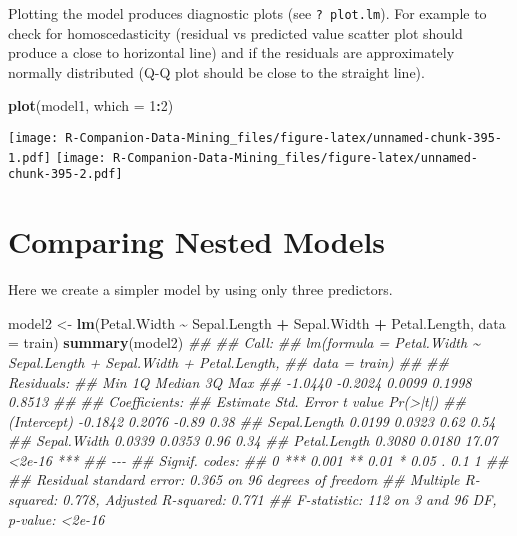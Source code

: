 \documentclass[
  notitlepage]{book}
\newenvironment{Shaded}{\begin{snugshade}}{\end{snugshade}}
\newcommand{\CommentTok}[1]{\textcolor[rgb]{0.56,0.35,0.01}{\textit{#1}}}
\newcommand{\DataTypeTok}[1]{\textcolor[rgb]{0.13,0.29,0.53}{#1}}
\newcommand{\DecValTok}[1]{\textcolor[rgb]{0.00,0.00,0.81}{#1}}
\newcommand{\KeywordTok}[1]{\textcolor[rgb]{0.13,0.29,0.53}{\textbf{#1}}}
\newcommand{\NormalTok}[1]{#1}
\newcommand{\OperatorTok}[1]{\textcolor[rgb]{0.81,0.36,0.00}{\textbf{#1}}}
\newcommand{\StringTok}[1]{\textcolor[rgb]{0.31,0.60,0.02}{#1}}
\begin{document}
Plotting the model produces diagnostic plots (see \texttt{?\ plot.lm}). For example
to check for homoscedasticity (residual vs predicted value scatter plot should produce a close to horizontal line)
and if the residuals are approximately normally distributed (Q-Q plot should be close to the straight line).

\begin{Shaded}
\begin{Highlighting}[]
\KeywordTok{plot}\NormalTok{(model1, }\DataTypeTok{which =} \DecValTok{1}\OperatorTok{:}\DecValTok{2}\NormalTok{)}
\end{Highlighting}
\end{Shaded}

\texttt{[image: R-Companion-Data-Mining\_files/figure-latex/unnamed-chunk-395-1.pdf]} \texttt{[image: R-Companion-Data-Mining\_files/figure-latex/unnamed-chunk-395-2.pdf]}

\hypertarget{comparing-nested-models}{%
\section{Comparing Nested Models}\label{comparing-nested-models}}

Here we create a simpler model by using only three predictors.

\begin{Shaded}
\begin{Highlighting}[]
\NormalTok{model2 \textless{}{-}}\StringTok{ }\KeywordTok{lm}\NormalTok{(Petal.Width }\OperatorTok{\textasciitilde{}}\StringTok{ }\NormalTok{Sepal.Length }\OperatorTok{+}\StringTok{ }
\StringTok{               }\NormalTok{Sepal.Width }\OperatorTok{+}\StringTok{ }\NormalTok{Petal.Length,}
             \DataTypeTok{data =}\NormalTok{ train)}
\KeywordTok{summary}\NormalTok{(model2)}
\CommentTok{\#\# }
\CommentTok{\#\# Call:}
\CommentTok{\#\# lm(formula = Petal.Width \textasciitilde{} Sepal.Length + Sepal.Width + Petal.Length, }
\CommentTok{\#\#     data = train)}
\CommentTok{\#\# }
\CommentTok{\#\# Residuals:}
\CommentTok{\#\#     Min      1Q  Median      3Q     Max }
\CommentTok{\#\# {-}1.0440 {-}0.2024  0.0099  0.1998  0.8513 }
\CommentTok{\#\# }
\CommentTok{\#\# Coefficients:}
\CommentTok{\#\#              Estimate Std. Error t value Pr(\textgreater{}|t|)    }
\CommentTok{\#\# (Intercept)   {-}0.1842     0.2076   {-}0.89     0.38    }
\CommentTok{\#\# Sepal.Length   0.0199     0.0323    0.62     0.54    }
\CommentTok{\#\# Sepal.Width    0.0339     0.0353    0.96     0.34    }
\CommentTok{\#\# Petal.Length   0.3080     0.0180   17.07   \textless{}2e{-}16 ***}
\CommentTok{\#\# {-}{-}{-}}
\CommentTok{\#\# Signif. codes:  }
\CommentTok{\#\# 0 \textquotesingle{}***\textquotesingle{} 0.001 \textquotesingle{}**\textquotesingle{} 0.01 \textquotesingle{}*\textquotesingle{} 0.05 \textquotesingle{}.\textquotesingle{} 0.1 \textquotesingle{} \textquotesingle{} 1}
\CommentTok{\#\# }
\CommentTok{\#\# Residual standard error: 0.365 on 96 degrees of freedom}
\CommentTok{\#\# Multiple R{-}squared:  0.778,  Adjusted R{-}squared:  0.771 }
\CommentTok{\#\# F{-}statistic:  112 on 3 and 96 DF,  p{-}value: \textless{}2e{-}16}
\end{Highlighting}
\end{Shaded}
\end{document}

